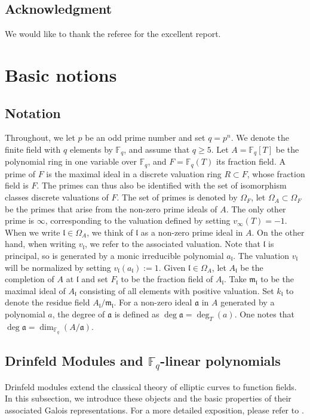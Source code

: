 \documentclass[11pt]{amsart}
\newcommand{\F}{\mathbb{F}}
\numberwithin{equation}{section}
\begin{document}
\subsection*{Acknowledgment
}We would like to thank the referee for the excellent report.

\section{Basic notions}
\subsection{Notation}
Throughout, we let $p$ be an odd prime number and set $ q = p^n $. We denote the finite field with $ q $ elements by $\mathbb{F}_q$, and assume that $ q \geq 5 $. Let $ A = \mathbb{F}_q[T] $ be the polynomial ring in one variable over $\mathbb{F}_q$, and $ F = \mathbb{F}_q(T) $ its fraction field. A prime of $F$ is the maximal ideal in a discrete valuation ring $R\subset F$, whose fraction field is $F$. The primes can thus also be identified with the set of isomorphism classes discrete valuations of $F$. The set of primes is denoted by $\Omega_F$, let $\Omega_A\subset \Omega_F$ be the primes that arise from the non-zero prime ideals of $A$. The only other prime is $\infty$, corresponding to the valuation defined by setting $v_\infty(T)=-1$. When we write $\mathfrak{l}\in \Omega_A$, we think of $\mathfrak{l}$ as a non-zero prime ideal in $A$. On the other hand, when writing $v_{\mathfrak{l}}$, we refer to the associated valuation. Note that $\mathfrak{l}$ is principal, so is generated by a monic irreducible polynomial $a_{\mathfrak{l}}$. The valuation $v_{\mathfrak{l}}$ will be normalized by setting $v_{\mathfrak{l}}(a_{\mathfrak{l}}):=1$. Given $\mathfrak{l}\in \Omega_A$, let $A_\mathfrak{l}$ be the completion of $A$ at $\mathfrak{l}$ and set $F_\mathfrak{l}$ to be the fraction field of $A_\mathfrak{l}$. Take $\mathfrak{m}_\mathfrak{l}$ to be the maximal ideal of $A_\mathfrak{l}$ consisting of all elements with positive valuation. Set $k_\mathfrak{l}$ to denote the residue field $A_\mathfrak{l}/\mathfrak{m}_\mathfrak{l}$. For a non-zero ideal $\mathfrak{a}$ in $ A $ generated by a polynomial $ a $, the degree of $\mathfrak{a}$ is defined as $\deg \mathfrak{a} = \deg_T(a) $. One notes that $\deg \mathfrak{a}=\dim_{\F_q} (A/\mathfrak{a})$. 

 \subsection{Drinfeld Modules and $\F_q$-linear polynomials}
\par Drinfeld modules extend the classical theory of elliptic curves to function fields. In this subsection, we introduce these objects and the basic properties of their associated Galois representations. For a more detailed exposition, please refer to \cite{papibook}.
\end{document}
